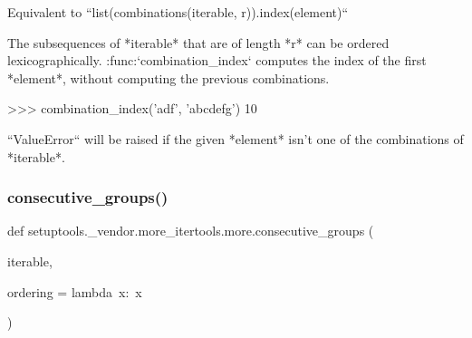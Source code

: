 \begin{DoxyVerb}Equivalent to ``list(combinations(iterable, r)).index(element)``

The subsequences of *iterable* that are of length *r* can be ordered
lexicographically. :func:`combination_index` computes the index of the
first *element*, without computing the previous combinations.

    >>> combination_index('adf', 'abcdefg')
    10

``ValueError`` will be raised if the given *element* isn't one of the
combinations of *iterable*.
\end{DoxyVerb}
 \mbox{\label{namespacesetuptools_1_1__vendor_1_1more__itertools_1_1more_abd9ab8bac8a71702ca7bda7826edf112}} 
\subsubsection{\texorpdfstring{consecutive\+\_\+groups()}{consecutive\_groups()}}
{\footnotesize\ttfamily def setuptools.\+\_\+vendor.\+more\+\_\+itertools.\+more.\+consecutive\+\_\+groups (\begin{DoxyParamCaption}\item[{}]{iterable,  }\item[{}]{ordering = {\ttfamily lambda~x\+:~x} }\end{DoxyParamCaption})}

